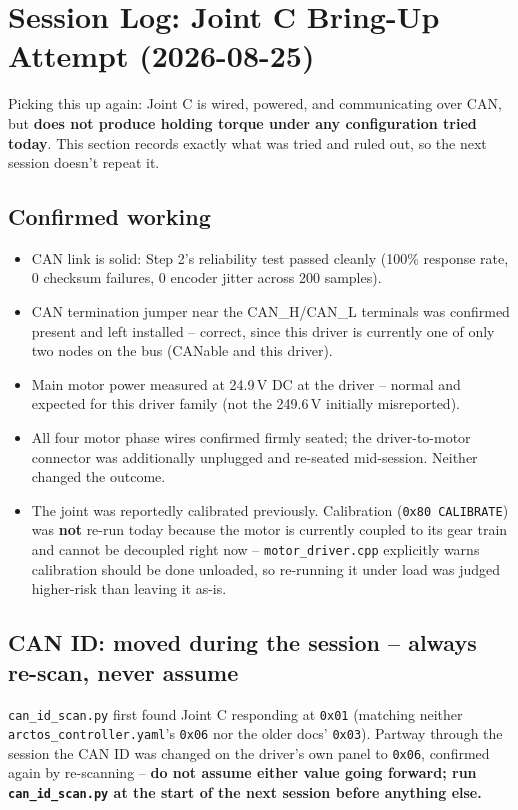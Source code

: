\documentclass[11pt,letterpaper]{article}
\begin{document}
\section{Session Log: Joint C Bring-Up Attempt (2026-08-25)}
\label{sec:session-2026-08-25}
Picking this up again: Joint C is wired, powered, and communicating over CAN, but \textbf{does not produce holding torque under any configuration tried today}. This section records exactly what was tried and ruled out, so the next session doesn't repeat it.

\subsection{Confirmed working}
\begin{itemize}
    \item CAN link is solid: Step 2's reliability test passed cleanly (100\% response rate, 0 checksum failures, 0 encoder jitter across 200 samples).
    \item CAN termination jumper near the CAN\_H/CAN\_L terminals was confirmed present and left installed -- correct, since this driver is currently one of only two nodes on the bus (CANable and this driver).
    \item Main motor power measured at 24.9\,V DC at the driver -- normal and expected for this driver family (not the 249.6\,V initially misreported).
    \item All four motor phase wires confirmed firmly seated; the driver-to-motor connector was additionally unplugged and re-seated mid-session. Neither changed the outcome.
    \item The joint was reportedly calibrated previously. Calibration (\texttt{0x80 CALIBRATE}) was \textbf{not} re-run today because the motor is currently coupled to its gear train and cannot be decoupled right now -- \texttt{motor\_driver.cpp} explicitly warns calibration should be done unloaded, so re-running it under load was judged higher-risk than leaving it as-is.
\end{itemize}

\subsection{CAN ID: moved during the session -- always re-scan, never assume}
\texttt{can\_id\_scan.py} first found Joint C responding at \texttt{0x01} (matching neither \texttt{arctos\_controller.yaml}'s \texttt{0x06} nor the older docs' \texttt{0x03}). Partway through the session the CAN ID was changed on the driver's own panel to \texttt{0x06}, confirmed again by re-scanning -- \textbf{do not assume either value going forward; run \texttt{can\_id\_scan.py} at the start of the next session before anything else.}
\end{document}
